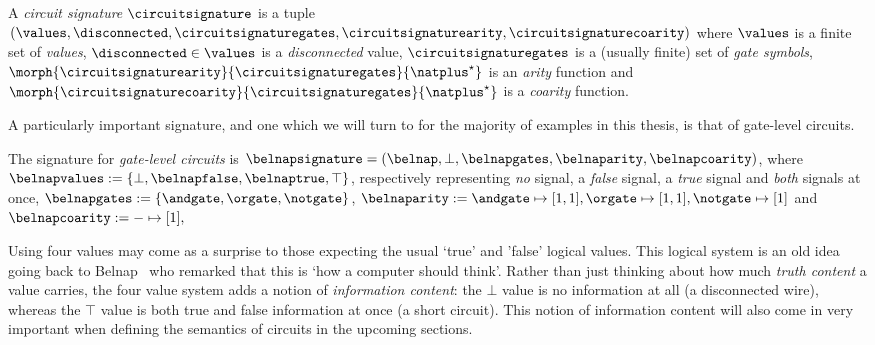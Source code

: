 \begin{definition}
    A \emph{circuit signature} \(\circuitsignature\) is a tuple \((
        \values,
        \disconnected,
        \circuitsignaturegates,
        \circuitsignaturearity,
        \circuitsignaturecoarity
    )\) where \(\values\) is a finite set of \emph{values}, \(
        \disconnected \in \values
    \) is a \emph{disconnected} value, \(\circuitsignaturegates\) is a (usually
    finite) set of \emph{gate symbols}, \(
        \morph{\circuitsignaturearity}{\circuitsignaturegates}{\natplus^\star}
    \) is an \emph{arity} function and \(
        \morph{\circuitsignaturecoarity}{\circuitsignaturegates}{\natplus^\star}
    \) is a \emph{coarity} function.
\end{definition}

A particularly important signature, and one which we will turn to for the
majority of examples in this thesis, is that of gate-level circuits.

\begin{example}\label{ex:sig}
    The signature for \emph{gate-level circuits} is \(
        \belnapsignature = (
            \belnap,
            \bot,
            \belnapgates,
            \belnaparity,
            \belnapcoarity
    )\), where \(
        \belnapvalues := \{\bot, \belnapfalse, \belnaptrue, \top\}
    \), respectively representing \emph{no} signal, a \emph{false} signal, a
        \emph{true} signal and \emph{both} signals at once, \(
        \belnapgates := \{\andgate,\orgate,\notgate\}
    \), \(
        \belnaparity :=
            \andgate \mapsto [1,1],
            \orgate \mapsto [1,1],
            \notgate \mapsto [1]
    \) and \(
        \belnapcoarity := - \mapsto [1],
    \)
\end{example}

\begin{remark}
    Using four values may come as a surprise to those expecting the usual
    `true' and 'false' logical values.
    This logical system is an old idea going back to
    Belnap~\cite{belnap1977useful} who remarked that this is `how a computer
    should think'.
    Rather than just thinking about how much \emph{truth content} a value
    carries, the four value system adds a notion of \emph{information content}:
    the \(\bot\) value is no information at all (a disconnected wire), whereas
    the \(\top\) value is both true and false information at once
    (a short circuit).
    This notion of information content will also come in very important when
    defining the semantics of circuits in the upcoming sections.
\end{remark}

